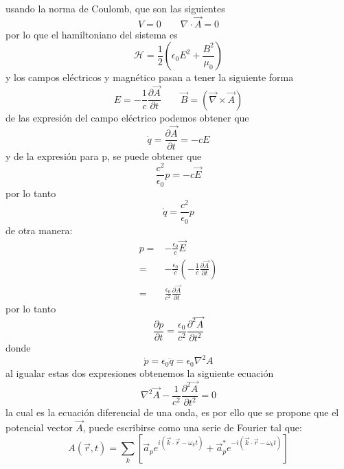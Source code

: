 usando la norma de Coulomb, que son las siguientes
\begin{equation*}
    V=0 \qquad \nabla \cdot \vec{A} = 0
\end{equation*}
por lo que el hamiltoniano del sistema es
\begin{equation*}
    \mathcal{H}= \frac{1}{2}\left(\epsilon_0 E^2 + \frac{B^2}{\mu_0}\right)
\end{equation*}
y los campos eléctricos y magnético pasan a tener la siguiente forma
\begin{equation*}
    E=-\frac{1}{c}\frac{\partial \vec{A}}{\partial t} \qquad \vec{B}=  \left(\vec{\nabla}\times\vec{A}\right)
\end{equation*}
de las expresión del campo eléctrico podemos obtener que
\begin{equation*}
    \dot{q}= \frac{\partial \vec{A}}{\partial t}= -cE
\end{equation*}
y de la expresión para p, se puede obtener que
\begin{equation*}
    \frac{c^2}{\epsilon_0} p= -c \vec{E}
\end{equation*}
por lo tanto
\begin{equation*}
    \dot{q}= \frac{c^2}{\epsilon_0} p
\end{equation*}
de otra manera:
\begin{align*}
    p=& -\frac{\epsilon_0}{c} \vec{E} \\
    =& -\frac{\epsilon_0}{c}\left(-\frac{1}{c}\frac{\partial \vec{A}}{\partial t}\right)\\
    =& \frac{\epsilon_0}{c^2}\frac{\partial \vec{A}}{\partial t}
\end{align*}
por lo tanto
\begin{equation*}
    \frac{\partial p}{\partial t} = \frac{\epsilon_0}{c^2} \frac{\partial^2 \vec{A}}{\partial t^2}
\end{equation*}
donde
\begin{equation*}
    \dot{p}= \epsilon_0\ddot{q} = \epsilon_0\nabla^2 A    
\end{equation*}
al igualar estas dos expresiones obtenemos la siguiente ecuación
\begin{equation*}
    \nabla^2 \vec{A} - \frac{1}{c^2} \frac{\partial^2 \vec{A}}{\partial t^2}=0
\end{equation*}
la cual es la ecuación diferencial de una onda, es por ello que se propone que el potencial vector $\vec{A}$, puede escribirse como una serie de Fourier tal que:
\begin{equation*}
    A(\vec{r},t) =\sum_k\left[\vec{a}_{p} e^{i\left(\vec{k}\cdot \vec{r}-\omega_k t \right)}+\vec{a}_{p}^* e^{-i\left(\vec{k}\cdot \vec{r}-\omega_k t \right)}\right]
\end{equation*}
